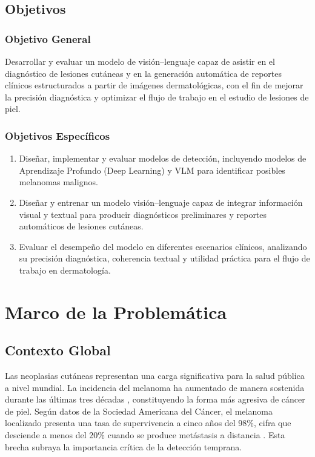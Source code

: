 \documentclass[11pt, a4paper]{article}
\begin{document}
\subsection{Objetivos}

\subsubsection{Objetivo General}
Desarrollar y evaluar un modelo de visión--lenguaje capaz de asistir en el diagnóstico de lesiones cutáneas y en la generación automática de reportes clínicos estructurados a partir de imágenes dermatológicas, con el fin de mejorar la precisión diagnóstica y
optimizar el flujo de trabajo en el estudio de lesiones de piel.

\subsubsection{Objetivos Específicos}
\begin{enumerate}
    \item Diseñar, implementar y evaluar modelos de detección, incluyendo modelos de Aprendizaje Profundo (Deep Learning) y VLM para identificar posibles melanomas malignos.
    \item Diseñar y entrenar un modelo visión--lenguaje capaz de integrar información visual y textual para producir diagnósticos preliminares y reportes automáticos de lesiones cutáneas.
    \item Evaluar el desempeño del modelo en diferentes escenarios clínicos, analizando su precisión diagnóstica, coherencia textual y utilidad práctica para el flujo de trabajo en dermatología.
\end{enumerate}

\section{Marco de la Problemática}

\subsection{Contexto Global}

Las neoplasias cutáneas representan una carga significativa para la salud pública a nivel mundial. La incidencia del melanoma ha aumentado de manera sostenida durante las últimas tres décadas \cite{khan_ensemble_2025}, constituyendo la forma más agresiva de cáncer de piel. Según datos de la Sociedad Americana del Cáncer, el melanoma localizado presenta una tasa de supervivencia a cinco años del 98\%, cifra que desciende a menos del 20\% cuando se produce metástasis a distancia \cite{khan_ensemble_2025}. Esta brecha subraya la importancia crítica de la detección temprana.
\end{document}
